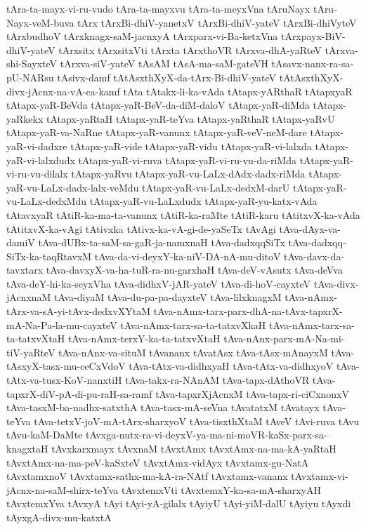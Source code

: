 {tAra-ta-mayx-vi-ru-vudo
tAra-ta-mayxvu
tAra-ta-meyxVna
tAruNayx
tAru-Nayx-veM-buva
tArx
tArxBi-dhiV-yanetxV
tArxBi-dhiV-yateV
tArxBi-dhiVyteV
tArxbudhoV
tArxknagx-saM-jacnxyA
tArxparx-vi-Ba-ketxVna
tArxpayx-BiV-dhiV-yateV
tArxsitx
tArxsitxVti
tArxta
tArxthoVR
tArxva-dhA-yaRteV
tArxva-shi-SayxteV
tArxva-siV-yateV
tAsAM
tAsA-ma-saM-gateVH
tAsavx-nanx-ra-sa-pU-NARsu
tAsivx-damf
tAtAsxthXyX-da-tArx-Bi-dhiV-yateV
tAtAsxthXyX-divx-jAcnx-na-vA-ca-kamf
tAta
tAtakx-li-ka-vAda
tAtapx-yARthaR
tAtapxyaR
tAtapx-yaR-BeVda
tAtapx-yaR-BeV-da-diM-daloV
tAtapx-yaR-diMda
tAtapx-yaRkekx
tAtapx-yaRtaH
tAtapx-yaR-teYva
tAtapx-yaRthaR
tAtapx-yaRvU
tAtapx-yaR-va-NaRne
tAtapx-yaR-vanunx
tAtapx-yaR-veV-neM-dare
tAtapx-yaR-vi-dadxre
tAtapx-yaR-vide
tAtapx-yaR-vidu
tAtapx-yaR-vi-lalxda
tAtapx-yaR-vi-lalxdudx
tAtapx-yaR-vi-ruva
tAtapx-yaR-vi-ru-vu-da-riMda
tAtapx-yaR-vi-ru-vu-dilalx
tAtapx-yaRvu
tAtapx-yaR-vu-LaLx-dAdx-dadx-riMda
tAtapx-yaR-vu-LaLx-dadx-lalx-veMdu
tAtapx-yaR-vu-LaLx-dedxM-darU
tAtapx-yaR-vu-LaLx-dedxMdu
tAtapx-yaR-vu-LaLxdudx
tAtapx-yaR-yu-katx-vAda
tAtavxyaR
tAtiR-ka-ma-ta-vanunx
tAtiR-ka-raMte
tAtiR-karu
tAtitxvX-ka-vAda
tAtitxvX-ka-vAgi
tAtivxka
tAtivx-ka-vA-gi-de-yaSeTx
tAvAgi
tAva-dAyx-va-damiV
tAva-dUBx-ta-saM-sa-gaR-ja-namxnaH
tAva-dadxqqSiTx
tAva-dadxqq-SiTx-ka-taqRtavxM
tAva-da-vi-deyxY-ka-niV-DA-nA-mu-ditoV
tAva-davx-da-tavxtarx
tAva-davxyX-va-ha-tuR-ra-nu-garxhaH
tAva-deV-vAsutx
tAva-deVva
tAva-deY-hi-ka-seyxVha
tAva-didhxV-jAR-yateV
tAva-di-hoV-cayxteV
tAva-divx-jAcnxnaM
tAva-diyaM
tAva-du-pa-pa-dayxteV
tAva-lilxknagxM
tAva-nAmx-tArx-va-sA-yi-tAvx-dedxvXYtaM
tAva-nAmx-tarx-parx-dhA-na-tAvx-tapxrX-mA-Na-Pa-la-mu-cayxteV
tAva-nAmx-tarx-sa-ta-tatxvXkaH
tAva-nAmx-tarx-sa-ta-tatxvXtaH
tAva-nAmx-terxY-ka-ta-tatxvXtaH
tAva-nAnx-parx-mA-Na-mi-tiV-yaRteV
tAva-nAnx-va-situM
tAvananx
tAvatAsx
tAva-tAsx-mAnayxM
tAva-tAsxyX-tasx-mu-ceCxVdoV
tAva-tAtx-va-didhxyaH
tAva-tAtx-va-didhxyoV
tAva-tAtx-va-tusx-KoV-nanxtiH
tAva-takx-ra-NAnAM
tAva-tapx-dAthoVR
tAva-tapxrX-diV-pA-di-pu-raH-sa-ramf
tAva-tapxrXjAcnxM
tAva-tapx-ri-ciCxnonxV
tAva-tasxM-ba-nadhx-satxthA
tAva-tasx-mA-seVna
tAvatatxM
tAvatayx
tAva-teYva
tAva-tetxV-joV-mA-tArx-sharxyoV
tAva-tisxthXtaM
tAveV
tAvi-ruva
tAvu
tAvu-kaM-DaMte
tAvxga-nutx-ra-vi-deyxV-ya-ma-ni-moVR-kaSx-parx-sa-knagxtaH
tAvxkarxmayx
tAvxnaM
tAvxtAmx
tAvxtAmx-na-ma-kA-yaRtaH
tAvxtAmx-na-ma-peV-kaSxteV
tAvxtAmx-vidAyx
tAvxtamx-gu-NatA
tAvxtamxnoV
tAvxtamx-sathx-ma-kA-ra-NAtf
tAvxtamx-vananx
tAvxtamx-vi-jAcnx-na-saM-shirx-teYva
tAvxtemxVti
tAvxtemxY-ka-sa-mA-sharxyAH
tAvxtemxYva
tAvxyA
tAyi
tAyi-yA-gilalx
tAyiyU
tAyi-yiM-dalU
tAyiyu
tAyxdi
tAyxgA-divx-mu-katxtA
}
